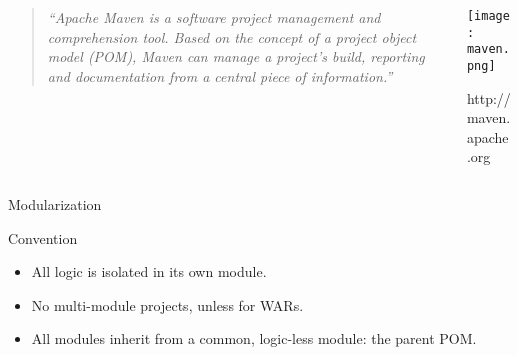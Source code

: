 \documentclass[presentation,c]{beamer}
\begin{document}
{
\begin{frame}[label=sec-5-1]{}

\begin{columns}
\begin{column}{0.6\textwidth}
\begin{quotation} %

\textit{``Apache Maven is a software project management and comprehension tool. Based on the concept of a project object model (POM), Maven can manage a project's build, reporting and documentation from a central piece of information.''}
\end{quotation}
\end{column}

\begin{column}{0.4\textwidth}
\texttt{[image: maven.png]}

\small{http://maven.apache.org}
\end{column}
\end{columns}
\end{frame}
} %

{
\begin{frame}[label=sec-5-2]{Modularization}

\begin{block}{Convention}
\begin{itemize}
\item All logic is isolated in its own module.
\item No multi-module projects, unless for WARs.
\item All modules inherit from a common, logic-less module: the parent POM.
\end{itemize}
\end{block}
\end{frame}
} %
\end{document}
